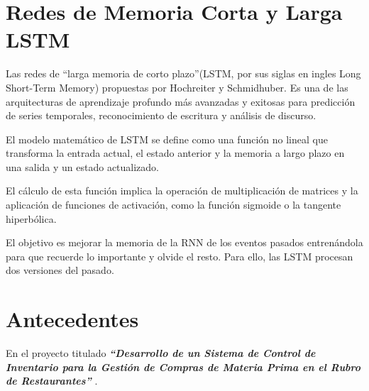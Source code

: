 \section{Redes de Memoria Corta y Larga LSTM}

Las redes de “larga memoria de corto plazo”(LSTM, por sus siglas en ingles Long Short-Term Memory) propuestas por Hochreiter y Schmidhuber. Es una de las arquitecturas de aprendizaje profundo más avanzadas y exitosas para predicción de series temporales, reconocimiento de escritura y análisis de discurso\cite{fernandez2021estimacion}.

El modelo matemático de LSTM se define como una función no lineal que transforma la entrada actual, el estado anterior y la memoria a largo plazo en una salida y un estado actualizado.

El cálculo de esta función implica la  operación  de  multiplicación  de  matrices  y  la  aplicación  de  funciones  de  activación,  como la función sigmoide o la tangente hiperbólica\cite{tomas2023prediccion}.

El objetivo es mejorar la memoria de la RNN de los eventos pasados entrenándola para que recuerde lo importante y olvide el resto. Para ello, las LSTM procesan dos versiones del pasado\cite{arana2021redes}.


\section{Antecedentes}
En el proyecto titulado \textbf{\textit{“Desarrollo de un Sistema de Control de Inventario para la Gestión de Compras de Materia Prima en el Rubro de Restaurantes”}} \cite{condorena2017desarrollo}. 

